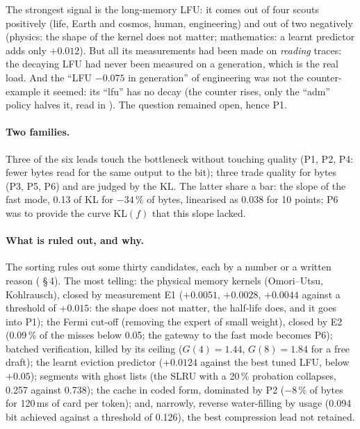 The strongest signal is the long-memory LFU: it comes out of four scouts positively (life, Earth and cosmos, human, engineering) and out of two negatively (physics: the shape of the kernel does not matter; mathematics: a learnt predictor adds only $+0.012$). But all its measurements had been made on \emph{reading} traces: the decaying LFU had never been measured on a generation, which is the real load. And the ``LFU $-0.075$ in generation'' of engineering was not the counter-example it seemed: its ``lfu'' has no decay (the counter rises, only the ``adm'' policy halves it, read in ). The question remained open, hence P1.

\paragraph{Two families.} Three of the six leads touch the bottleneck without touching quality (P1, P2, P4: fewer bytes read for the same output to the bit); three trade quality for bytes (P3, P5, P6) and are judged by the KL. The latter share a bar: the slope of the fast mode, 0.13 of KL for $-34\,\%$ of bytes, linearised as 0.038 for 10 points; P6 was to provide the curve KL$(f)$ that this slope lacked.

\paragraph{What is ruled out, and why.} The sorting rules out some thirty candidates, each by a number or a written reason ( §\,4). The most telling: the physical memory kernels (Omori--Utsu, Kohlrausch), closed by measurement E1 ($+0.0051$, $+0.0028$, $+0.0044$ against a threshold of $+0.015$: the shape does not matter, the half-life does, and it goes into P1); the Fermi cut-off (removing the expert of small weight), closed by E2 (0.09\,\% of the misses below 0.05; the gateway to the fast mode becomes P6); batched verification, killed by its ceiling ($G(4) = 1.44$, $G(8) = 1.84$ for a free draft); the learnt eviction predictor ($+0.0124$ against the best tuned LFU, below $+0.05$); segments with ghost lists (the SLRU with a 20\,\% probation collapses, 0.257 against 0.738); the cache in coded form, dominated by P2 ($-8\,\%$ of bytes for 120\,ms of card per token); and, narrowly, reverse water-filling by usage (0.094 bit achieved against a threshold of 0.126), the best compression lead not retained.

